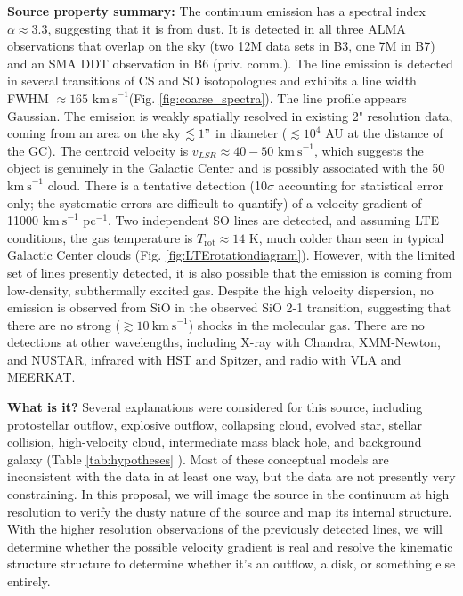 \documentclass[12pt,a4paper]{article}  %
\newcommand{\kms}{\ensuremath{\mathrm{km~s}^{-1}}\xspace}
\begin{document}
\textbf{Source property summary:}
The continuum emission has a spectral index $\alpha\approx3.3$, suggesting that it is from dust.
It is detected in all three ALMA observations that overlap on the sky (two 12M data sets in B3, one 7M in B7) and an SMA DDT observation in B6 (priv. comm.).
The line emission is detected in several transitions of CS and SO isotopologues and exhibits a line width FWHM $\approx165$ \kms (Fig. \ref{fig:coarse_spectra}).  The line profile appears Gaussian.
The emission is weakly spatially resolved in existing 2" resolution data, coming from an area on the sky $\lesssim1"$ in diameter ($\lesssim10^4$ AU at the distance of the GC).
The centroid velocity is $v_{LSR}\approx40-50$ \kms, which suggests the object is genuinely in the Galactic Center and is possibly associated with the 50 \kms cloud.
There is a tentative detection (10$\sigma$ accounting for statistical error only; the systematic errors are difficult to quantify) of a velocity gradient of 11000 \kms pc$^{-1}$.
Two independent SO lines are detected, and assuming LTE conditions, the gas temperature is $T_\mathrm{rot}\approx 14$ K, much colder than seen in typical Galactic Center clouds (Fig. \ref{fig:LTErotationdiagram}).
However, with the limited set of lines presently detected, it is also possible that the emission is coming from low-density, subthermally excited gas.
Despite the high velocity dispersion, no emission is observed from SiO in the observed SiO 2-1 transition, suggesting that there are no strong ($\gtrsim10~\kms$) shocks in the molecular gas.
There are no detections at other wavelengths, including X-ray with Chandra, XMM-Newton, and NUSTAR, infrared with HST and Spitzer, and radio with VLA and MEERKAT.


\textbf{What is it?}
Several explanations were considered for this source, including protostellar outflow, explosive outflow, collapsing cloud, evolved star, stellar collision, high-velocity cloud, intermediate mass black hole, and background galaxy (Table \ref{tab:hypotheses} \citep{Ginsburg2024}).
Most of these conceptual models are inconsistent with the data in at least one way, but the data are not presently very constraining.
In this proposal, we will image the source in the continuum at high resolution to verify the dusty nature of the source and map its internal structure.
With the higher resolution observations of the previously detected lines, we will  determine whether the possible velocity gradient is real and resolve the kinematic structure structure to determine whether it's an outflow, a disk, or something else entirely.
\end{document}

